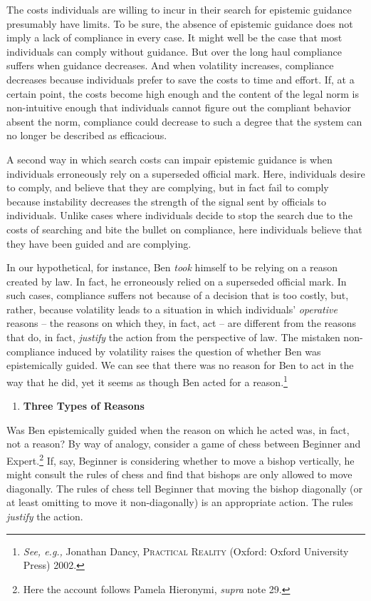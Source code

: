 The costs individuals are willing to incur in their search for epistemic
guidance presumably have limits. To be sure, the absence of epistemic
guidance does not imply a lack of compliance in every case. It might
well be the case that most individuals can comply without guidance. But
over the long haul compliance suffers when guidance decreases. And when
volatility increases, compliance decreases because individuals prefer to
save the costs to time and effort. If, at a certain point, the costs
become high enough and the content of the legal norm is non-intuitive
enough that individuals cannot figure out the compliant behavior absent
the norm, compliance could decrease to such a degree that the system can
no longer be described as efficacious.

A second way in which search costs can impair epistemic guidance is when
individuals erroneously rely on a superseded official mark. Here,
individuals desire to comply, and believe that they are complying, but
in fact fail to comply because instability decreases the strength of the
signal sent by officials to individuals. Unlike cases where individuals
decide to stop the search due to the costs of searching and bite the
bullet on compliance, here individuals believe that they have been
guided and are complying.

In our hypothetical, for instance, Ben \emph{took} himself to be relying
on a reason created by law. In fact, he erroneously relied on a
superseded official mark. In such cases, compliance suffers not because
of a decision that is too costly, but, rather, because volatility leads
to a situation in which individuals' \emph{operative} reasons -- the
reasons on which they, in fact, act -- are different from the reasons
that do, in fact, \emph{justify} the action from the perspective of law.
The mistaken non-compliance induced by volatility raises the question of
whether Ben was epistemically guided. We can see that there was no
reason for Ben to act in the way that he did, yet it seems as though Ben
acted for a reason.\footnote{\emph{See, e.g.,} Jonathan Dancy,
  \textsc{Practical Reality} (Oxford: Oxford University Press) 2002.}

\begin{enumerate}
\def\labelenumi{\arabic{enumi}.}
\item
  \textbf{Three Types of Reasons}
\end{enumerate}

Was Ben epistemically guided when the reason on which he acted was, in
fact, not a reason? By way of analogy, consider a game of chess between
Beginner and Expert.\footnote{Here the account follows Pamela Hieronymi,
  \emph{supra} note 29.} If, say, Beginner is considering whether to
move a bishop vertically, he might consult the rules of chess and find
that bishops are only allowed to move diagonally. The rules of chess
tell Beginner that moving the bishop diagonally (or at least omitting to
move it non-diagonally) is an appropriate action. The rules
\emph{justify} the action.

